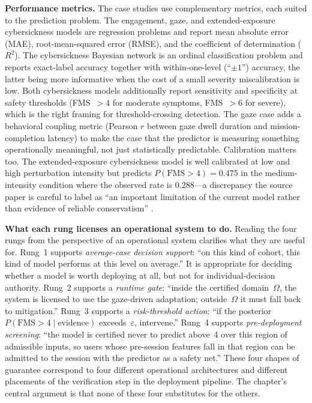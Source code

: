 \documentclass[graybox]{svmult}
\begin{document}
\textbf{Performance metrics.} The case studies use complementary metrics, each suited to the prediction problem. The engagement, gaze, and extended-exposure cybersickness models are regression problems and report mean absolute error (MAE), root-mean-squared error (RMSE), and the coefficient of determination ($R^2$). The cybersickness Bayesian network is an ordinal classification problem and reports exact-label accuracy together with within-one-level (``$\pm 1$'') accuracy, the latter being more informative when the cost of a small severity miscalibration is low. Both cybersickness models additionally report sensitivity and specificity at safety thresholds (FMS~$>4$ for moderate symptoms, FMS~$>6$ for severe), which is the right framing for threshold-crossing detection. The gaze case adds a behavioral coupling metric (Pearson $r$ between gaze dwell duration and mission-completion latency) to make the case that the predictor is measuring something operationally meaningful, not just statistically predictable. Calibration matters too. The extended-exposure cybersickness model is well calibrated at low and high perturbation intensity but predicts $P(\text{FMS} > 4) = 0.475$ in the medium-intensity condition where the observed rate is 0.288---a discrepancy the source paper is careful to label as ``an important limitation of the current model rather than evidence of reliable conservatism'' \citep{cybersickness2025extended}.

\textbf{What each rung licenses an operational system to do.} Reading the four rungs from the perspective of an operational system clarifies what they are useful for. Rung~1 supports \emph{average-case decision support}: ``on this kind of cohort, this kind of model performs at this level on average.'' It is appropriate for deciding whether a model is worth deploying at all, but not for individual-decision authority. Rung~2 supports a \emph{runtime gate}: ``inside the certified domain~$\Omega$, the system is licensed to use the gaze-driven adaptation; outside~$\Omega$ it must fall back to mitigation.'' Rung~3 supports a \emph{risk-threshold action}: ``if the posterior $P(\text{FMS} > 4 \mid \text{evidence})$ exceeds~$\varepsilon$, intervene.'' Rung~4 supports \emph{pre-deployment screening}: ``the model is certified never to predict above~4 over this region of admissible inputs, so users whose pre-session features fall in that region can be admitted to the session with the predictor as a safety net.'' These four shapes of guarantee correspond to four different operational architectures and different placements of the verification step in the deployment pipeline. The chapter's central argument is that none of these four substitutes for the others.
\end{document}
